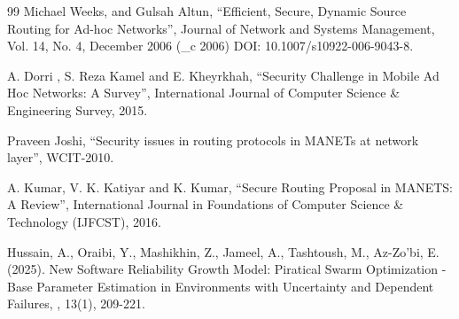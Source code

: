 \documentclass{default}
\begin{document}
\begin{thebibliography}{99}
Michael Weeks, and Gulsah Altun, “Efficient, Secure, Dynamic Source Routing for Ad-hoc Networks”, Journal of Network and Systems Management, Vol. 14, No. 4, December 2006 (\_c 2006) DOI: 10.1007/s10922-006-9043-8.

A. Dorri , S. Reza Kamel and E. Kheyrkhah, “Security Challenge in Mobile Ad Hoc Networks: A Survey”, International Journal of Computer Science \& Engineering Survey, 2015.

Praveen Joshi, “Security issues in routing protocols in MANETs at network layer”, WCIT-2010.

A. Kumar, V. K. Katiyar and K. Kumar, “Secure Routing Proposal in MANETS: A Review”, International Journal in Foundations of Computer Science \& Technology (IJFCST), 2016.

Hussain, A., Oraibi, Y., Mashikhin, Z., Jameel, A., Tashtoush, M., Az-Zo’bi, E. (2025). New Software Reliability Growth Model: Piratical Swarm Optimization -Base Parameter Estimation in Environments with Uncertainty and Dependent Failures, , 13(1), 209-221.

\end{thebibliography}
\end{document}
